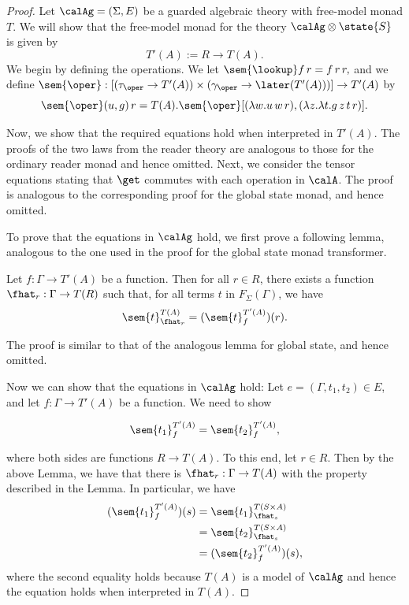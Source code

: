 \begin{proof}

Let $\calAg = (\Sigma, E)$ be a guarded algebraic theory with free-model monad
$T$. We will show that the free-model monad for the theory $\calAg \otimes
\state{S}$ is given by
%
\[ T'(A) := R \to T(A). \]
%
We begin by defining the operations. We let
%
$\sem{\lookup} f\, r = f\, r\, r,$
%
and we define $\sem{\oper} : [(\tau_\oper \to T'(A)) \times (\gamma_\oper \to \later(T'(A)))] \to T'(A)$ by
%
\[ 
  \sem{\oper}(u, g)\, r = 
    T(A).\sem{\oper}
      [(\lambda w. u\, w\, r), (\lambda z. \lambda t. g\, z\, t\, r)].
\]

Now, we show that the required equations hold when interpreted in $T'(A)$.
%
The proofs of the two laws from the reader theory are analogous to those for the
ordinary reader monad and hence omitted.
%
Next, we consider the tensor equations stating that $\get$ commutes with each
operation in $\calA$. The proof is analogous to the corresponding proof for the
global state monad, and hence omitted.

To prove that the equations in $\calAg$ hold, we first prove a following lemma,
analogous to the one used in the proof for the global state monad transformer.
%
\begin{lemma}
    Let $f : \Gamma \to T'(A)$ be a function. Then for all $r \in R$, there
    exists a function $\fhat_r : \Gamma \to T(R)$ such that, for all terms $t$
    in $F_\Sigma(\Gamma)$, we have
    \[ \sem{t}_{\fhat_r}^{T(A)} = (\sem{t}_f^{T'(A)})(r). \]
\end{lemma}
The proof is similar to that of the analogous lemma for global state, and hence
omitted.

Now we can show that the equations in $\calAg$ hold:
Let $e = (\Gamma, t_1, t_2) \in
E$, and let $f : \Gamma \to T'(A)$ be a function. We need to show

\[ \sem{t_1}_f^{T'(A)} = \sem{t_2}_f^{T'(A)}, \]

where both sides are functions $R \to T(A)$. To this end, let $r \in R$.
Then by the above Lemma, we have that there is $\fhat_r : \Gamma \to T(A)$
with the property described in the Lemma. In particular, we have
%
\begin{align*}
    (\sem{t_1}_f^{T'(A)})(s) 
    &= \sem{t_1}_{\fhat_s}^{T(S \times A)} \\
    &= \sem{t_2}_{\fhat_s}^{T(S \times A)} \\
    &= (\sem{t_2}_f^{T'(A)})(s),
\end{align*}
%
where the second equality holds because $T(A)$ is a model of $\calAg$
and hence the equation holds when interpreted in $T(A)$.


\end{proof}
